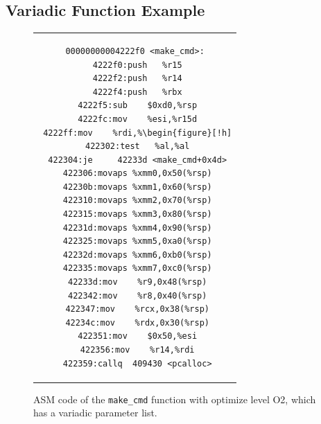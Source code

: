 \subsection{Variadic Function Example}
\begin{figure}[thp] %
\centering          %
\begin{tabular}{c}  %
\footnotesize
\begin{lstlisting}
00000000004222f0 <make_cmd>:
 4222f0:push   %r15
 4222f2:push   %r14
 4222f4:push   %rbx
 4222f5:sub    $0xd0,%rsp
 4222fc:mov    %esi,%r15d
 4222ff:mov    %rdi,%\begin{figure}[!h]
 422302:test   %al,%al
 422304:je     42233d <make_cmd+0x4d>
 422306:movaps %xmm0,0x50(%rsp)
 42230b:movaps %xmm1,0x60(%rsp)
 422310:movaps %xmm2,0x70(%rsp)
 422315:movaps %xmm3,0x80(%rsp)
 42231d:movaps %xmm4,0x90(%rsp)
 422325:movaps %xmm5,0xa0(%rsp)
 42232d:movaps %xmm6,0xb0(%rsp)
 422335:movaps %xmm7,0xc0(%rsp)
 42233d:mov    %r9,0x48(%rsp)
 422342:mov    %r8,0x40(%rsp)
 422347:mov    %rcx,0x38(%rsp)
 42234c:mov    %rdx,0x30(%rsp)
 422351:mov    $0x50,%esi
 422356:mov    %r14,%rdi
 422359:callq  409430 <pcalloc>
\end{lstlisting}
\end{tabular}
\caption{ASM code of the \texttt{make\_cmd} function with optimize level O2, which has a variadic parameter list.}
\label{fig:asmvariadic}
\end{figure}


